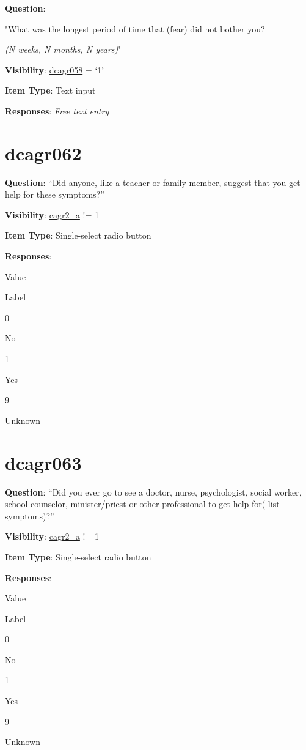 \documentclass[]{book}
\begin{document}
\textbf{Question}:

"What was the longest period of time that (fear) did not bother you?

\emph{(N weeks, N months, N years)}"

\textbf{Visibility}: \protect\hyperlink{dcagr058}{dcagr058} = `1'

\textbf{Item Type}: Text input

\textbf{Responses}: \emph{Free text entry}

\hypertarget{dcagr062}{%
\section{dcagr062}\label{dcagr062}}

\textbf{Question}: ``Did anyone, like a teacher or family member, suggest that you get help for these symptoms?''

\textbf{Visibility}: \protect\hyperlink{cagr2_a}{cagr2\_a} != 1

\textbf{Item Type}: Single-select radio button

\textbf{Responses}:

Value

Label

0

No

1

Yes

9

Unknown

\hypertarget{dcagr063}{%
\section{dcagr063}\label{dcagr063}}

\textbf{Question}: ``Did you ever go to see a doctor, nurse, psychologist, social worker, school counselor, minister/priest or other professional to get help for( list symptoms)?''

\textbf{Visibility}: \protect\hyperlink{cagr2_a}{cagr2\_a} != 1

\textbf{Item Type}: Single-select radio button

\textbf{Responses}:

Value

Label

0

No

1

Yes

9

Unknown
\end{document}
